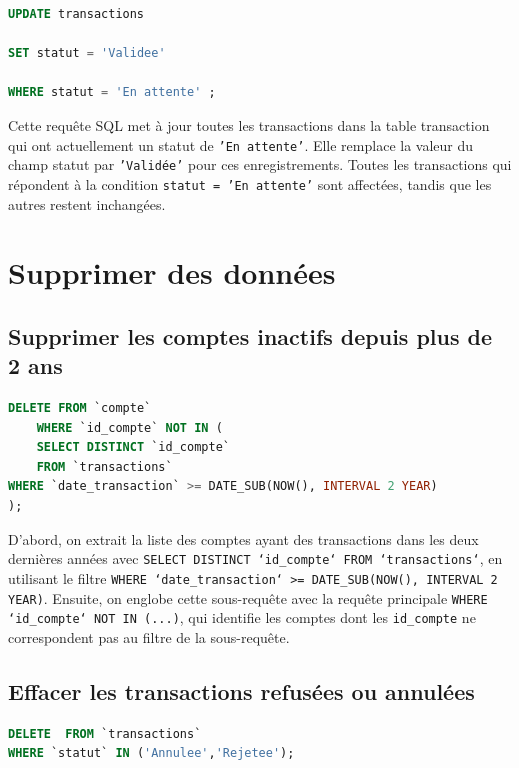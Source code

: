 \documentclass[12pt,a4paper]{article}
\begin{document}
\begin{lstlisting}[language=SQL]
UPDATE transactions 

SET statut = 'Validee' 

WHERE statut = 'En attente' ; 
\end{lstlisting}

\vspace{.5cm}

Cette requête SQL met à jour toutes les transactions dans la table transaction qui ont actuellement un statut de \texttt{'En attente'}. Elle remplace la valeur du champ statut par \texttt{'Validée'} pour ces enregistrements. Toutes les transactions qui répondent à la condition \texttt{statut = 'En attente'} sont affectées, tandis que les autres restent inchangées. 
	
\newpage	
	
\section{Supprimer des données}

	\subsection{Supprimer les comptes inactifs depuis plus de 2 ans}
\begin{lstlisting}[language=SQL]
DELETE FROM `compte` 
	WHERE `id_compte` NOT IN ( 
	SELECT DISTINCT `id_compte` 
	FROM `transactions` 
WHERE `date_transaction` >= DATE_SUB(NOW(), INTERVAL 2 YEAR) 
); 
\end{lstlisting}

\vspace{.5cm}

D'abord, on extrait la liste des comptes ayant des transactions dans les deux dernières années avec \texttt{SELECT DISTINCT `id\_compte` FROM `transactions`}, en utilisant le filtre \texttt{WHERE `date\_transaction` >= DATE\_SUB(NOW(), INTERVAL 2 YEAR)}. Ensuite, on englobe cette sous-requête avec la requête principale \texttt{WHERE `id\_compte` NOT IN (...)}, qui identifie les comptes dont les \texttt{id\_compte} ne correspondent pas au filtre de la sous-requête.
	
	
	\subsection{Effacer les transactions refusées ou annulées}
\begin{lstlisting}[language=SQL]
DELETE  FROM `transactions` 
WHERE `statut` IN ('Annulee','Rejetee'); 
\end{lstlisting}
\end{document}
